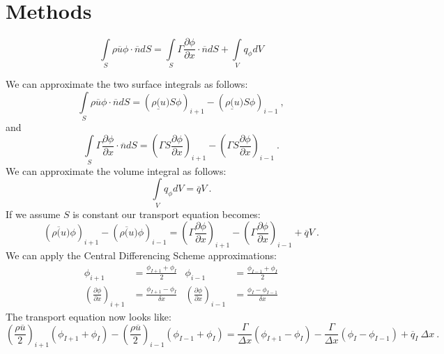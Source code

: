 \documentclass[12pt]{article}
\begin{document}
\section{Methods}

\begin{equation}
    \int\limits_S \rho \overline{u} \phi \cdot \overline{n} dS = \int\limits_S \Gamma \frac{\partial \phi}{\partial x} \cdot \overline{n} dS + \int\limits_V q_{\phi} dV
    \label{eq:transport}
\end{equation}

We can approximate the two surface integrals as follows:
\begin{equation*}
    \int\limits_S \rho \overline{u} \phi \cdot \overline{n} dS = \left( \rho\underline(u) S\phi \right)_{i+1} - \left( \rho\underline(u) S\phi \right)_{i-1}\:,
\end{equation*}
and
\begin{equation*}
    \int\limits_S \Gamma \frac{\partial \phi}{\partial x} \cdot \overline{n} dS = \left( \Gamma S \frac{\partial \phi}{\partial x} \right)_{i+1} - \left( \Gamma S \frac{\partial \phi}{\partial x} \right)_{i-1}\:.
\end{equation*}
We can approximate the volume integral as follows:
\begin{equation*}
    \int\limits_V q_{\phi} dV = \overline{q} V\:.
\end{equation*}
If we assume $S$ is constant our transport equation becomes:
\begin{equation*}
    \left( \rho \overline(u) \phi \right)_{i+1} - \left( \rho \overline(u) \phi \right)_{i-1} = \left( \Gamma \frac{\partial \phi}{\partial x} \right)_{i+1} - \left( \Gamma \frac{\partial \phi}{\partial x} \right)_{i-1} + \overline{q} V\:.
\end{equation*}
We can apply the Central Differencing Scheme approximations:
\begin{align*}
    \phi_{i+1} &= \frac{\phi_{I+1} + \phi_{I}}{2} & \phi_{i-1} &= \frac{\phi_{I-1} + \phi_{I}}{2} \\
    \left(\frac{\partial \phi}{\partial x}\right)_{i+1} &= \frac{\phi_{I+1} - \phi_{I}}{\delta x} & \left(\frac{\partial \phi}{\partial x}\right)_{i-1} &= \frac{\phi_{I} - \phi_{I-1}}{\delta x}
\end{align*}
The transport equation now looks like:
\begin{equation*}
    \left(\frac{\rho \overline{u}}{2}\right)_{i+1} \left( \phi_{I+1} + \phi_{I} \right) - \left(\frac{\rho \overline{u}}{2}\right)_{i-1} \left( \phi_{I-1} + \phi_{I} \right) = \frac{\Gamma}{\Delta x} \left( \phi_{I+1} - \phi_{I} \right) - \frac{\Gamma}{\Delta x} \left( \phi_{I} - \phi_{I-1} \right) + \overline{q}_{I}\: \Delta x\:.
\end{equation*}
\end{document}
